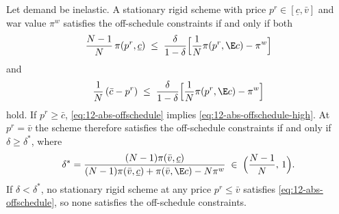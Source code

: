 \begin{proposition}\label{prop:12-abs-critical}
Let demand be inelastic. A stationary rigid scheme with price $p^r \in [\underline c, \bar v]$ and war value
$\pi^w$ satisfies the off-schedule constraints if and only if both
\begin{equation}\label{eq:12-abs-offschedule}
\frac{N - 1}{N}\,\pi(p^r, \underline c) \;\le\; \frac{\delta}{1 - \delta}\Bigl[\frac{1}{N}\pi(p^r, \E c) - \pi^w\Bigr]
\end{equation}
and
\begin{equation}\label{eq:12-abs-offschedule-high}
\frac{1}{N}\,(\bar c - p^r) \;\le\; \frac{\delta}{1 - \delta}\Bigl[\frac{1}{N}\pi(p^r, \E c) - \pi^w\Bigr]
\end{equation}
hold. If $p^r \ge \bar c$, \eqref{eq:12-abs-offschedule} implies \eqref{eq:12-abs-offschedule-high}. At
$p^r = \bar v$ the scheme therefore satisfies the off-schedule constraints if and only if $\delta \ge \delta^*$, where
\begin{equation}\label{eq:12-abs-deltastar}
\delta^* = \frac{(N - 1)\pi(\bar v, \underline c)}{(N - 1)\pi(\bar v, \underline c) + \pi(\bar v, \E c) - N\pi^w}
\;\in\;\Bigl(\frac{N - 1}{N},\, 1\Bigr).
\end{equation}
If $\delta < \delta^*$, no stationary rigid scheme at any price $p^r \le \bar v$ satisfies \eqref{eq:12-abs-offschedule},
so none satisfies the off-schedule constraints.
\end{proposition}

